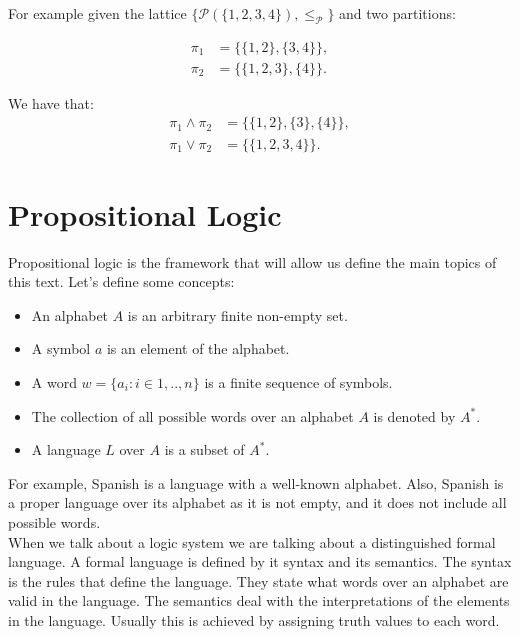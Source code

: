 For example given the lattice $\{\mathcal{P}(\{1,2,3,4\}),\le_{\mathcal{P}}\}$ and two partitions:

\begin{equation}
    \begin{split}
      \pi_1 & = \{\{1,2\},\{3,4\}\},\\
      \pi_2 & = \{\{1,2,3\},\{4\}\}.
\end{split}
\end{equation}

We have that:
\begin{equation}
    \begin{split}
      \pi_1\land\pi_2 & = \{\{1,2\},\{3\},\{4\}\},\\
      \pi_1\lor\pi_2 & = \{\{1,2,3,4\}\}.
\end{split}
\end{equation}

  
\section{Propositional Logic}
Propositional logic is the framework that will allow us define the main topics of this text.  Let's define some concepts:
\begin{itemize}
\item An alphabet $A$ is an arbitrary finite non-empty set.
\item A symbol $a$ is an element of the alphabet.
\item A word $w = \{a_i:i\in 1,..,n\}$ is a finite sequence of symbols.
\item The collection of all possible words over an alphabet $A$ is denoted by $A^*$.
\item A language $L$ over $A$ is a subset of $A^*$.
\end{itemize}

For example, Spanish is a language with a well-known alphabet. Also, Spanish is a proper language over its alphabet as it is not empty, and it does not include all possible words.\\

When we talk about a logic system we are talking about a distinguished formal language. A formal language is defined by it syntax and its semantics. The syntax is the rules that define the language. They state what words over an alphabet are valid in the language. The semantics deal with the interpretations of the elements in the language. Usually this is achieved by assigning truth values to each word.\\

